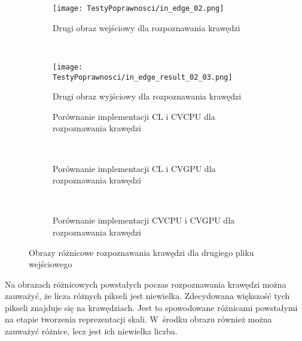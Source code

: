 \begin{figure}[h]

\begin{center}
\begin{subfigure}[t]{0.3\textwidth}
\texttt{[image: TestyPoprawnosci/in\_edge\_02.png]}
\caption{Drugi obraz wejściowy dla rozpoznawania krawędzi}
\label{fig:valEdge02}
\end{subfigure}
~
\begin{subfigure}[t]{0.3\textwidth}
\texttt{[image: TestyPoprawnosci/in\_edge\_result\_02\_03.png]}
\caption{Drugi obraz wyjściowy dla rozpoznawania krawędzi}
\label{fig:valEdgeResult02}
\end{subfigure}
\end{center}

\begin{subfigure}[t]{0.3\textwidth}
	\centering
	\setlength\fboxsep{0pt}
	\setlength\fboxrule{0.5pt}
	\caption{Porównanie implementacji CL i CVCPU dla rozpoznawania krawędzi}
	\label{fig:valEdge2CLCVCPU}
\end{subfigure}
~
\begin{subfigure}[t]{0.3\textwidth}
	\centering
	\setlength\fboxsep{0pt}
	\setlength\fboxrule{0.5pt}
	\caption{Porównanie implementacji CL i CVGPU dla rozpoznawania krawędzi}
	\label{fig:valEdge2CLCVGPU}
\end{subfigure}
~
\begin{subfigure}[t]{0.3\textwidth}
	\centering
	\setlength\fboxsep{0pt}
	\setlength\fboxrule{0.5pt}
	\caption{Porównanie implementacji CVCPU i CVGPU dla rozpoznawania krawędzi}
	\label{fig:valEdge2CVCPUCVGPU}                 
\end{subfigure}
\caption{Obrazy różnicowe rozpoznawania krawędzi dla drugiego pliku wejściowego}

\label{fig:valEdge2}
\end{figure}

Na obrazach różnicowych powstałych poczas rozpoznawania krawędzi można zauważyć, że licza różnych pikseli jest niewielka. Zdecydowana większość tych pikseli znajduje się na krawędziach. Jest to spowodowane różnicami powstałymi na etapie tworzenia reprezentacji skali. W~środku obrazu również można zauważyć różnice, lecz jest ich niewielka liczba.

